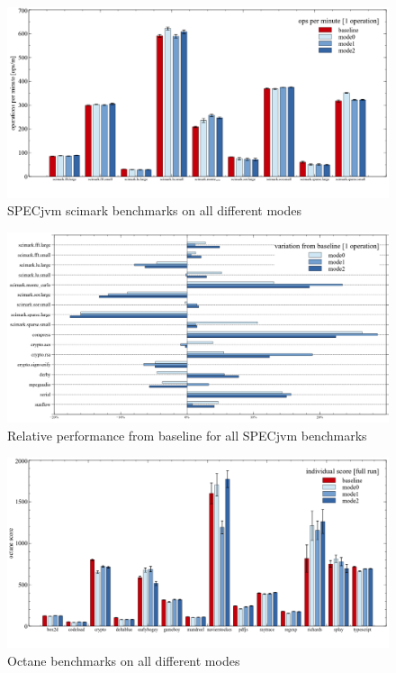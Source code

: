 \begin{figure}[ht]
  \begin{center}
    \centering
    \includegraphics[width=1.0\textwidth]{figures/scimark_warmup.png}
    \caption{SPECjvm scimark benchmarks on all different modes}
    \label{f:scimark_warmup}
  \end{center}
\end{figure}

\begin{figure}[ht]
  \begin{center}
    \centering
    \includegraphics[width=1.0\textwidth]{figures/all_warmup_variation.png}
    \caption{Relative performance from baseline for all SPECjvm benchmarks}
    \label{f:all_warmup_variation}
  \end{center}
\end{figure}

\begin{figure}[ht]
  \begin{center}
    \centering
    \includegraphics[width=1.0\textwidth]{figures/octane.png}
    \caption{Octane benchmarks on all different modes}
    \label{f:octane}
  \end{center}
\end{figure}

